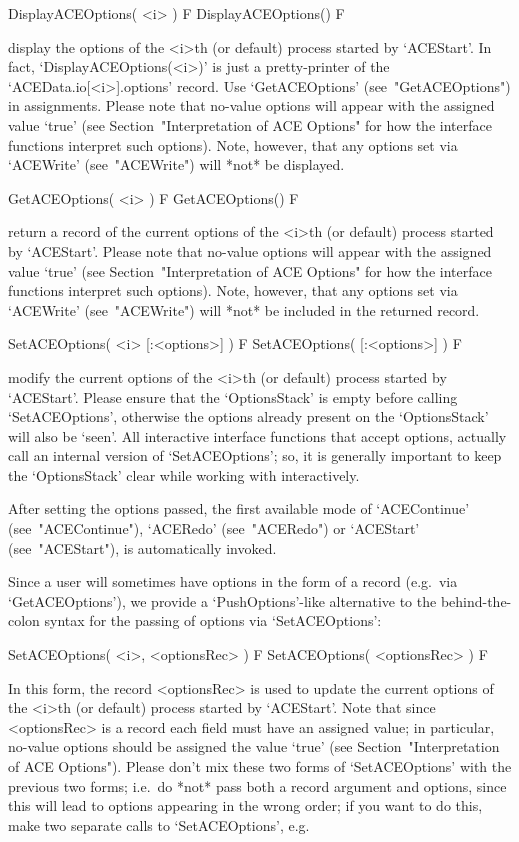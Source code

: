 \>DisplayACEOptions( <i> ) F
\>DisplayACEOptions() F

display the options of the  <i>th  (or  default)  process  started  by
`ACEStart'. In fact, `DisplayACEOptions(<i>)' is just a pretty-printer
of   the   `ACEData.io[<i>].options'   record.   Use   `GetACEOptions'
(see~"GetACEOptions") in assignments. Please note that no-value {\ACE}
options  will   appear   with   the   assigned   value   `true'   (see
Section~"Interpretation of ACE Options" for how the  {\ACE}  interface
functions interpret such options). Note, however, that any options set
via `ACEWrite' (see~"ACEWrite") will *not* be displayed.

\>GetACEOptions( <i> ) F
\>GetACEOptions() F

return a record of the current  options  of  the  <i>th  (or  default)
process started  by  `ACEStart'.  Please  note  that  no-value  {\ACE}
options  will   appear   with   the   assigned   value   `true'   (see
Section~"Interpretation of ACE Options" for how the  {\ACE}  interface
functions interpret such options). Note, however, that any options set
via `ACEWrite' (see~"ACEWrite") will *not* be included in the returned
record.

\>SetACEOptions( <i> [:<options>] ) F
\>SetACEOptions( [:<options>] ) F

modify the current options of the <i>th (or default)  process  started
by `ACEStart'. Please ensure that the `OptionsStack' is  empty  before
calling `SetACEOptions', otherwise the options already present on  the
`OptionsStack'  will  also  be  \lq{}seen'.  All  interactive   {\ACE}
interface functions that accept options,  actually  call  an  internal
version of `SetACEOptions'; so, it is generally important to keep  the
`OptionsStack' clear while working with {\ACE} interactively.

After  setting  the  options  passed,  the  first  available  mode  of
`ACEContinue'  (see~"ACEContinue"),   `ACERedo'   (see~"ACERedo")   or
`ACEStart' (see~"ACEStart"), is automatically invoked.

Since a user will sometimes have options  in  the  form  of  a  record
(e.g.~via   `GetACEOptions'),   we   provide   a    `PushOptions'-like
alternative to the behind-the-colon syntax for the passing of  options
via `SetACEOptions':

\>SetACEOptions( <i>, <optionsRec> ) F
\>SetACEOptions( <optionsRec> ) F

In this form, the record <optionsRec> is used to  update  the  current
options of the <i>th (or default) process started by `ACEStart'.  Note
that since <optionsRec> is a record each field must have  an  assigned
value; in particular, no-value {\ACE} options should be  assigned  the
value `true' (see Section~"Interpretation  of  ACE  Options").  Please
don't mix these two forms of `SetACEOptions'  with  the  previous  two
forms; i.e.~do *not* pass both a record argument  and  options,  since
this will lead to options appearing in the wrong order; if you want to
do this, make two separate calls to `SetACEOptions', e.g.

